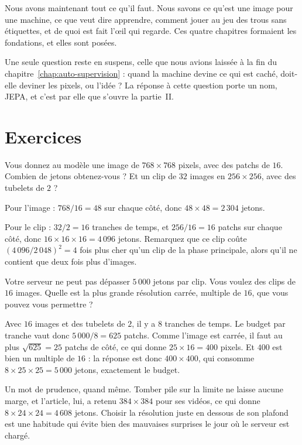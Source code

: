 \vspace{0.5em}

Nous avons maintenant tout ce qu'il faut. Nous savons ce qu'est une image
pour une machine, ce que veut dire apprendre, comment jouer au jeu des trous
sans étiquettes, et de quoi est fait l'œil qui regarde. Ces quatre chapitres
formaient les fondations, et elles sont posées.

Une seule question reste en suspens, celle que nous avions laissée à la fin
du chapitre~\ref{chap:auto-supervision} : quand la machine devine ce qui est
caché, doit-elle deviner les pixels, ou l'idée ? La réponse à cette question
porte un nom, JEPA, et c'est par elle que s'ouvre la partie~II.

\section*{Exercices}

\begin{exercice}
Vous donnez au modèle une image de $768 \times 768$ pixels, avec des patchs
de $16$. Combien de jetons obtenez-vous ? Et un clip de $32$ images en
$256 \times 256$, avec des tubelets de $2$ ?
\end{exercice}

\begin{solution}
Pour l'image : $768 / 16 = 48$ sur chaque côté, donc
$48 \times 48 = 2\,304$ jetons.

Pour le clip : $32 / 2 = 16$ tranches de temps, et $256/16 = 16$ patchs sur
chaque côté, donc $16 \times 16 \times 16 = 4\,096$ jetons. Remarquez que ce
clip coûte $(4\,096 / 2\,048)^2 = 4$ fois plus cher qu'un clip de la phase
principale, alors qu'il ne contient que deux fois plus d'images.
\end{solution}

\begin{exercice}
Votre serveur ne peut pas dépasser $5\,000$ jetons par clip. Vous voulez des
clips de $16$ images. Quelle est la plus grande résolution carrée, multiple
de $16$, que vous pouvez vous permettre ?
\end{exercice}

\begin{solution}
Avec $16$ images et des tubelets de $2$, il y a $8$ tranches de temps. Le
budget par tranche vaut donc $5\,000 / 8 = 625$ patchs. Comme l'image est
carrée, il faut au plus $\sqrt{625} = 25$ patchs de côté, ce qui donne
$25 \times 16 = 400$ pixels. Et $400$ est bien un multiple de $16$ :
la réponse est donc $400 \times 400$, qui consomme
$8 \times 25 \times 25 = 5\,000$ jetons, exactement le budget.

Un mot de prudence, quand même. Tomber pile sur la limite ne laisse aucune
marge, et l'article, lui, a retenu $384 \times 384$ pour ses vidéos, ce qui
donne $8 \times 24 \times 24 = 4\,608$ jetons. Choisir la résolution juste
en dessous de son plafond est une habitude qui évite bien des mauvaises
surprises le jour où le serveur est chargé.
\end{solution}

